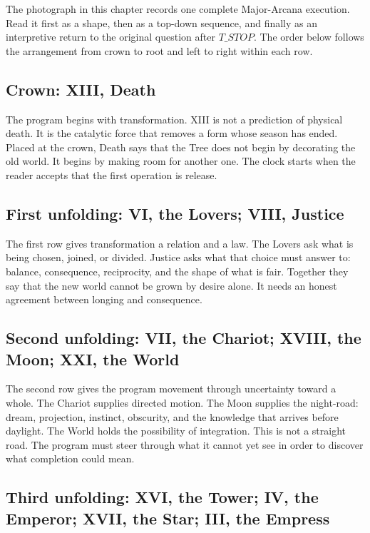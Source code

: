 The photograph in this chapter records one complete Major-Arcana execution.
Read it first as a shape, then as a top-down sequence, and finally as an
interpretive return to the original question after $T\_STOP$. The order below
follows the arrangement from crown to root and left to right within each row.

\subsection{Crown: XIII, Death}

The program begins with transformation. XIII is not a prediction of physical
death. It is the catalytic force that removes a form whose season has ended.
Placed at the crown, Death says that the Tree does not begin by decorating the
old world. It begins by making room for another one. The clock starts when the
reader accepts that the first operation is release.

\subsection{First unfolding: VI, the Lovers; VIII, Justice}

The first row gives transformation a relation and a law. The Lovers ask what is
being chosen, joined, or divided. Justice asks what that choice must answer to:
balance, consequence, reciprocity, and the shape of what is fair. Together they
say that the new world cannot be grown by desire alone. It needs an honest
agreement between longing and consequence.

\subsection{Second unfolding: VII, the Chariot; XVIII, the Moon; XXI, the World}

The second row gives the program movement through uncertainty toward a whole.
The Chariot supplies directed motion. The Moon supplies the night-road: dream,
projection, instinct, obscurity, and the knowledge that arrives before daylight.
The World holds the possibility of integration. This is not a straight road.
The program must steer through what it cannot yet see in order to discover what
completion could mean.

\subsection{Third unfolding: XVI, the Tower; IV, the Emperor; XVII, the Star;
III, the Empress}

